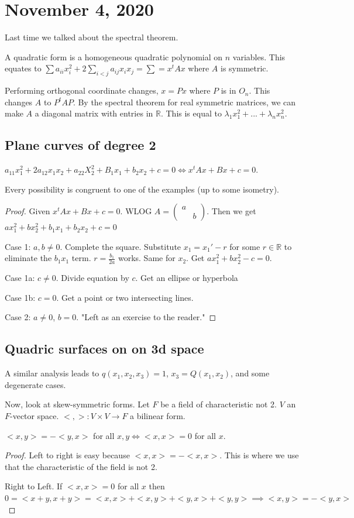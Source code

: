 \documentclass{article}
\newcommand{\R}{\mathbb{R}}
\newcommand{\ra}[1][]{\xrightarrow{#1}}
\begin{document}
\section{November 4, 2020}
Last time we talked about the spectral theorem.
\begin{definition}
A quadratic form is a homogeneous quadratic polynomial on $n$ variables. This equates to $\sum a_{ii}x_i^2+2\sum_{i<j}a_{ij}x_ix_j=\sum=x^tAx$ where $A$ is symmetric.
\end{definition}
Performing orthogonal coordinate changes, $x=Px$ where $P$ is in $O_n$. This changes $A$ to $P^tAP$. By the spectral theorem for real symmetric matrices, we can make $A$ a diagonal matrix with entries in $\R$. This is equal to $\lambda_1x_1^2+...+\lambda_nx_n^2$. 

\subsection{Plane curves of degree 2}
$a_11x_1^2+2a_{12}x_1x_2+a_22X_2^2+B_1x_1+b_2x_2+c=0\iff x^tAx+Bx+c=0$. 
\begin{theorem}
Every possibility is congruent to one of the examples (up to some isometry).
\end{theorem}
\begin{proof}
Given $x^tAx+Bx+c=0$. WLOG $A=\begin{pmatrix}
a&\\&b
\end{pmatrix}$. Then we get $ax_1^2+bx_2^2+b_1x_1+b_2x_2+c=0$

Case 1: $a,b\neq 0$. Complete the square. Substitute $x_1=x_1'-r$ for some $r\in \R$ to eliminate the $b_1x_1$ term. $r=\frac{b_1}{2a}$ works. Same for $x_2$. Get $ax_1^2+bx_2^2-c=0$.

Case 1a: $c\neq 0$. Divide equation by $c$. Get an ellipse or hyperbola

Case 1b: $c=0$. Get a point or two intersecting lines.

Case 2: $a\neq 0$, $b=0$. "Left as an exercise to the reader."

\end{proof}
\subsection{Quadric surfaces on on 3d space}
A similar analysis leads to $q(x_1,x_2,x_3)=1$, $x_3=Q(x_1,x_2)$, and some degenerate cases. 

Now, look at skew-symmetric forms. Let $F$ be a field of characteristic not 2. $V$ an $F$-vector space. $<,>:V\times V\ra F$ a bilinear form. 
\begin{proposition}
$<x,y>=-<y,x>$ for all $x,y \iff <x,x>=0$ for all $x$. 
\end{proposition}
\begin{proof}
Left to right is easy because $<x,x>=-<x,x>$. This is where we use that the characteristic of the field is not 2.

Right to Left. If $<x,x>=0$ for all $x$ then $0=<x+y,x+y>=<x,x>+<x,y>+<y,x>+<y,y>\implies <x,y>=-<y,x>$
\end{proof}
\end{document}
